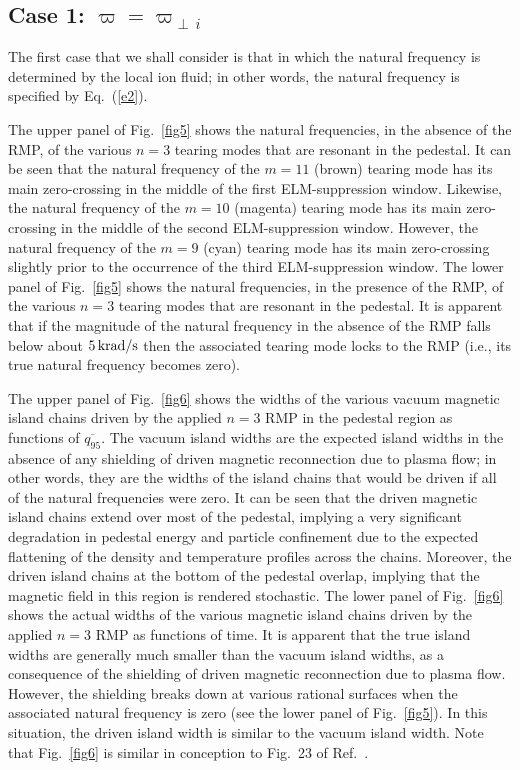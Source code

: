 \documentclass[12pt,prb,aps]{revtex4-1}
\begin{document}
\subsection{Case 1: $\varpi=\varpi_{\perp\,i}$}
The first case that we shall consider is that in which the natural frequency is determined by the local ion fluid; 
in other words, the natural frequency is specified by Eq.~(\ref{e2}). 

The upper panel of Fig.~\ref{fig5} shows the natural frequencies, in the absence of the RMP, of the various  $n=3$ tearing modes 
 that are resonant in the pedestal. It can be seen that the natural frequency of the $m=11$ (brown) tearing mode has its main zero-crossing in the middle
of the first ELM-suppression window. Likewise, the natural frequency of the $m=10$ (magenta) tearing mode has its main zero-crossing in the middle of the
second ELM-suppression window. However, the natural frequency of the $m=9$ (cyan) tearing mode  has its main zero-crossing slightly
prior to the occurrence of the third ELM-suppression window. The lower panel of Fig.~\ref{fig5} shows the natural frequencies, in the presence of the RMP, of the various $n=3$
tearing modes that are resonant in the pedestal. It is apparent that if the magnitude of the natural frequency in the absence of the RMP falls below about
$5\,{\rm krad/s}$ then the associated tearing mode locks to the RMP (i.e., its true natural frequency becomes zero). 

The upper panel of Fig.~\ref{fig6} shows the widths of the various vacuum magnetic island chains driven by the applied $n=3$ RMP in the pedestal region as functions of $
\overline{q_{95}}$.
The vacuum island widths are the  expected island widths in the absence of any shielding of driven magnetic reconnection due to
plasma flow; in other words, they are the  widths of the island chains that would be driven if all of the natural frequencies were zero. It can be seen that
the driven magnetic island chains extend over most of the pedestal, implying a very significant degradation in pedestal energy and particle confinement due to the
expected flattening of the density and temperature profiles across the chains. Moreover, the driven island chains at the
bottom of the pedestal overlap, implying that the magnetic field in this region is rendered stochastic. The lower panel
of Fig.~\ref{fig6} shows the actual widths of the various magnetic island chains driven by the applied $n=3$ RMP as functions of time. It is apparent 
that the true island widths are generally much smaller than the vacuum island widths, as a consequence of the shielding of driven magnetic
reconnection due to plasma flow. However, the shielding breaks down at various rational surfaces when the associated natural frequency is zero (see the lower panel of
Fig.~\ref{fig5}). In this situation, the driven island width is similar to the vacuum island width. Note that Fig.~\ref{fig6} is similar in conception to
Fig.~23 of Ref.~. 
\end{document}
